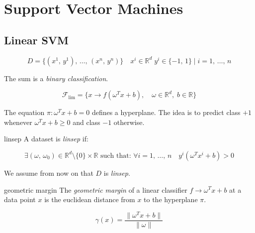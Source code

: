 \section{Support Vector Machines}

\subsection{Linear SVM}
\label{sec:linear-svm}

\begin{equation*}
  D = \{ (x^1,\, y^1),\, \dots,\, (x^n,\, y^n) \} \quad  x^i \in \mathds{R}^d \; y^i \in \{-1,\, 1\} \mid i = 1,\, \dots,\, n
\end{equation*}

The sum is a \emph{binary classification}.

\begin{equation}
  \mathcal{F}_{\text{lim}} = \{x \to f\left(\omega^Tx + b\right),\quad \omega \in \mathds{R}^d, \; b \in \mathds{R} \}
\end{equation}

The equation $\pi : \omega^Tx + b = 0$ defines a hyperplane.
The idea is to predict class $+1$ whenever $\omega^Tx + b \geq 0$ and class $-1$ otherwise.

\begin{definition}{linsep}{}
A dataset is \emph{linsep} if:

\begin{equation*}
\exists (\omega,\, \omega_0) \in \mathds{R}^d \setminus \{0\} \times \mathds{R}
\text{ such that: }
\forall i=1,\,\dots,\,n\quad y^i(\omega^Tx^i +b) > 0
\end{equation*}
\end{definition}

We assume from now on that $D$ is \emph{linsep}.

\begin{definition}{geometric margin}{}
The \emph{geometric margin} of a linear
classifier $f \to \omega^Tx + b$ at a data point $x$ is the
euclidean distance from $x$ to the hyperplane $\pi$.

\begin{equation*}
  \gamma(x) = \frac{\|\omega^Tx + b\|}{\lVert\omega\rVert} \tag{geometric margin}
\end{equation*}
\end{definition}

